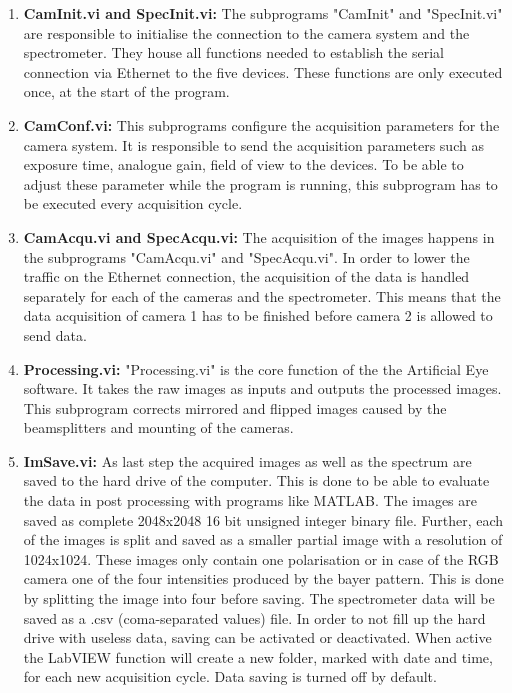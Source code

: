 \begin{enumerate}

	\item \textbf{CamInit.vi and SpecInit.vi:} The subprograms "CamInit" and "SpecInit.vi" are responsible to initialise the connection to the camera system and the spectrometer. They house all functions needed to establish the serial connection via Ethernet to the five devices. These functions are only executed once, at the start of the program.
	\item \textbf{CamConf.vi:} This subprograms configure the acquisition parameters for the camera system. It is responsible to send the acquisition parameters such as exposure time, analogue gain, field of view to the devices. To be able to adjust these parameter while the program is running, this subprogram has to be executed every acquisition cycle.
	\item \textbf{CamAcqu.vi and SpecAcqu.vi:} The acquisition of the images happens in the subprograms "CamAcqu.vi" and "SpecAcqu.vi". In order to lower the traffic on the Ethernet connection, the acquisition of the data is handled separately for each of the cameras and the spectrometer. This means that the data acquisition of camera 1 has to be finished before camera 2 is allowed to send data. 
	\item \textbf{Processing.vi:} "Processing.vi" is the core function of the the Artificial Eye software. It takes the raw images as inputs and outputs the processed images. This subprogram corrects mirrored and flipped images caused by the beamsplitters and mounting of the cameras.
	\item \textbf{ImSave.vi:} As last step the acquired images as well as the spectrum are saved to the hard drive of the computer. This is done to be able to evaluate the data in post processing with programs like MATLAB. The images are saved as complete 2048x2048 16 bit unsigned integer binary file. Further, each of the images is split and saved as a smaller partial image with a resolution of 1024x1024. These images only contain one polarisation or in case of the RGB camera one of the four intensities produced by the bayer pattern. This is done by splitting the image into four before saving. The spectrometer data will be saved as a .csv (coma-separated values) file. In order to not fill up the hard drive with useless data, saving can be activated or deactivated. When active the LabVIEW function will create a new folder, marked with date and time, for each new acquisition cycle. Data saving is turned off by default.

\end{enumerate}
